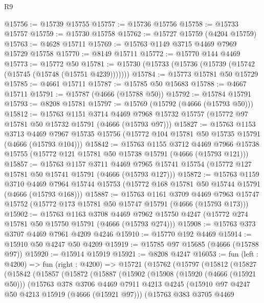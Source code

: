\begin{lexlean}{R9}
\begin{coremodule}
@15756 := @15739 @15755
@15757 := @15736 @15756
@15758 := @15733 @15757
@15759 := @15730 @15758
@15762 := @15727 @15759 (@4204 @15759)
@15763 := @4628 @15711
@15769 := @15763 @1149 @3715 @4469 @7969 @15729 @15758
@15770 := @8149 @15711
@15772 := @15770 @144 @4469
@15773 := @15772 @50
@15781 := @15730 (@15733 (@15736 (@15739 (@15742 (@15745 (@15748 (@15751 @4239)))))))
@15784 := @15773 @15781 @50 @15729
@15785 := @4661 @15711
@15787 := @15785 @50 @15683
@15788 := @4667 @15711
@15791 := @15787 (@4666 (@15788 @50))
@15792 := @15784 @15791
@15793 := @8208 @15781
@15797 := @15769 (@15792 (@4666 (@15793 @50)))
@15812 := @15763
    @1151
    @3714
    @4469
    @7968
    @15732
    @15757
    (@15772 @97 @15781 @50 @15732 @15791 (@4666 (@15793 @97)))
@15827 := @15763
    @1153
    @3713
    @4469
    @7967
    @15735
    @15756
    (@15772 @104 @15781 @50 @15735 @15791 (@4666 (@15793 @104)))
@15842 := @15763
    @1155
    @3712
    @4469
    @7966
    @15738
    @15755
    (@15772 @121 @15781 @50 @15738 @15791 (@4666 (@15793 @121)))
@15857 := @15763
    @1157
    @3711
    @4469
    @7965
    @15741
    @15754
    (@15772 @127 @15781 @50 @15741 @15791 (@4666 (@15793 @127)))
@15872 := @15763
    @1159
    @3710
    @4469
    @7964
    @15744
    @15753
    (@15772 @168 @15781 @50 @15744 @15791 (@4666 (@15793 @168)))
@15887 := @15763
    @1161
    @3709
    @4469
    @7963
    @15747
    @15752
    (@15772 @173 @15781 @50 @15747 @15791 (@4666 (@15793 @173)))
@15902 := @15763
    @1163
    @3708
    @4469
    @7962
    @15750
    @4247
    (@15772 @274 @15781 @50 @15750 @15791 (@4666 (@15793 @274)))
@15908 := @15763 @373 @3707 @4469 @7961 @4209 @4246
@15910 := @15770 @192 @4469
@15914 := @15910 @50 @4247 @50 @4209
@15919 := @15785 @97 @15685 (@4666 (@15788 @97))
@15920 := @15914 @15919
@15921 := @8208 @4247
@16053 := fun (left : @4200) =>
  fun (right : @4200) =>
  @15721
    (@15762
      (@15797
        (@15812
          (@15827
            (@15842
              (@15857
                (@15872
                  (@15887
                    (@15902
                      (@15908
                        (@15920 (@4666 (@15921 @50)))
                        (@15763
                          @378
                          @3706
                          @4469
                          @7911
                          @4213
                          @4245
                          (@15910 @97 @4247 @50 @4213 @15919 (@4666 (@15921 @97)))
                          (@15763
                            @383
                            @3705
                            @4469

\end{coremodule}
\end{lexlean}
